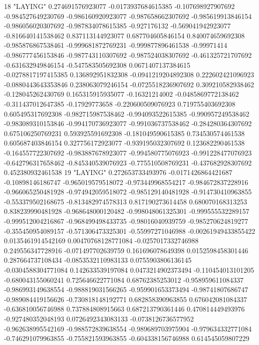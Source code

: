 18 "LAYING" 0.274691576923077 -0.0173937684615385 -0.107698927907692 -0.984527649230769 -0.986160920923077 -0.987658662307692 -0.985619913846154 -0.986056020307692 -0.987834078615385 -0.927176132 -0.569041942923077 -0.816640141538462 0.837113144923077 0.687704605846154 0.840074659692308 -0.985876867538461 -0.999681872769231 -0.999877896461538 -0.99971414 -0.986777456153846 -0.987743110307692 -0.987524038307692 -0.461325721707692 -0.631632949846154 -0.547583505692308 0.0671407137384615 -0.0278817197415385 0.136892951832308 -0.0941219204892308 0.222602421096923 -0.0880443643353846 0.238063079246154 -0.0725518236907692 0.309210582938462 -0.128045262430769 0.165315915935077 -0.16321214002 -0.0485869772138462 -0.311437012647385 -0.17929773658 -0.220600509076923 0.719755403692308 0.605495317692308 -0.982715987538462 -0.994093522615385 -0.990957249538462 -0.983089310153846 -0.994170736923077 -0.991036737538462 -0.284280364307692 0.675106250769231 0.593925591692308 -0.181049590615385 0.734530574461538 0.605687403846154 0.327756172923077 -0.939195032307692 0.123682290461538 -0.164557722307692 -0.983887678923077 -0.994580775076923 -0.991228477076923 -0.642796317658462 -0.845340539076923 -0.775510508769231 -0.437682928307692 0.452380932461538
19 "LAYING" 0.272653733493976 -0.0171426864421687 -0.10898146186747 -0.965019579518072 -0.973449968554217 -0.984672837228916 -0.966065250481928 -0.974942059518072 -0.985129140481928 -0.914730410963855 -0.553379502168675 -0.813482974578313 0.817190273614458 0.680070168313253 0.838239990481928 -0.968648000120482 -0.998048061325301 -0.999555532289157 -0.999512004216867 -0.968499498433735 -0.98016040939759 -0.985270624819277 -0.355450954089157 -0.571306473325301 -0.55997271046988 -0.00261949433855422 0.0135461914542169 0.00470768128771084 -0.0257017332746988 0.249556347728916 -0.071497702639759 0.161696078649398 0.0152598458301446 0.287664737108434 -0.0853532110983133 0.0755903806136145 -0.0304588304771084 0.142633539197084 0.0473214902373494 -0.110454013101205 -0.680043155060241 0.725646622771084 0.68762385253012 -0.958959611084337 -0.986993149638554 -0.988819031566265 -0.959901653373494 -0.98741807686747 -0.989084419156626 -0.730818148192771 0.682858390963855 0.676042081084337 -0.636810056746988 0.737884808915663 0.687213790361446 0.470814449493976 -0.927480352048193 0.0726492343083133 -0.0738126736577952 -0.962638995542169 -0.988572839638554 -0.989689703975904 -0.979634332771084 -0.746291079963855 -0.755821593963855 -0.604338156746988 0.614545059807229
